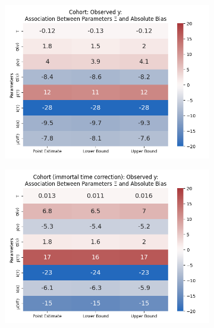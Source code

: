 \documentclass[12pt]{article}
\begin{document}
\begin{figure}[H]
	\begin{subfigure}[t]{0.23\linewidth}
		\centering
		\caption{}
		\includegraphics[scale=0.25]{VEMethod_Drivers1b_FEest_Li_MSpec_Heatmap5.png}
	\end{subfigure}
	\begin{subfigure}[t]{0.23\linewidth}
		\centering
		\caption{}
		\includegraphics[scale=0.25]{VEMethod_Drivers1b_FEest_Li_MSpec_Heatmap6.png}
	\end{subfigure}
	\begin{subfigure}[t]{0.23\linewidth}
		\centering
		\caption{}

\end{subfigure}
\end{figure}
\end{document}
